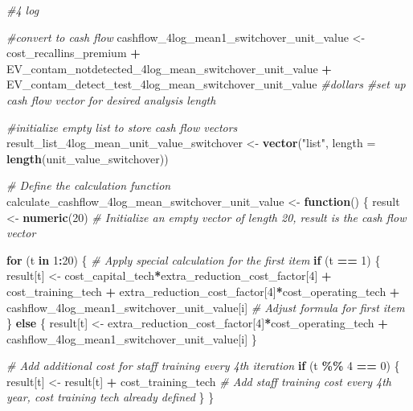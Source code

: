 \documentclass[
]{article}
\newenvironment{Shaded}{\begin{snugshade}}{\end{snugshade}}
\newcommand{\AttributeTok}[1]{\textcolor[rgb]{0.13,0.29,0.53}{#1}}
\newcommand{\CommentTok}[1]{\textcolor[rgb]{0.56,0.35,0.01}{\textit{#1}}}
\newcommand{\ControlFlowTok}[1]{\textcolor[rgb]{0.13,0.29,0.53}{\textbf{#1}}}
\newcommand{\DecValTok}[1]{\textcolor[rgb]{0.00,0.00,0.81}{#1}}
\newcommand{\FunctionTok}[1]{\textcolor[rgb]{0.13,0.29,0.53}{\textbf{#1}}}
\newcommand{\NormalTok}[1]{#1}
\newcommand{\OtherTok}[1]{\textcolor[rgb]{0.56,0.35,0.01}{#1}}
\newcommand{\SpecialCharTok}[1]{\textcolor[rgb]{0.81,0.36,0.00}{\textbf{#1}}}
\newcommand{\StringTok}[1]{\textcolor[rgb]{0.31,0.60,0.02}{#1}}
\begin{document}
\begin{Shaded}
\begin{Highlighting}[]
\CommentTok{\#4 log}

\CommentTok{\#convert to cash flow}
\NormalTok{cashflow\_4log\_mean1\_switchover\_unit\_value }\OtherTok{\textless{}{-}}\NormalTok{ cost\_recallins\_premium }\SpecialCharTok{+}\NormalTok{ EV\_contam\_notdetected\_4log\_mean\_switchover\_unit\_value }\SpecialCharTok{+}\NormalTok{ EV\_contam\_detect\_test\_4log\_mean\_switchover\_unit\_value }\CommentTok{\#dollars}
\CommentTok{\#set up cash flow vector for desired analysis length}


\CommentTok{\#initialize empty list to store cash flow vectors}
\NormalTok{result\_list\_4log\_mean\_unit\_value\_switchover }\OtherTok{\textless{}{-}} \FunctionTok{vector}\NormalTok{(}\StringTok{"list"}\NormalTok{, }\AttributeTok{length =} \FunctionTok{length}\NormalTok{(unit\_value\_switchover))}


\CommentTok{\# Define the calculation function}
\NormalTok{calculate\_cashflow\_4log\_mean\_switchover\_unit\_value }\OtherTok{\textless{}{-}} \ControlFlowTok{function}\NormalTok{() \{}
\NormalTok{  result }\OtherTok{\textless{}{-}} \FunctionTok{numeric}\NormalTok{(}\DecValTok{20}\NormalTok{)  }\CommentTok{\# Initialize an empty vector of length 20, result is the cash flow vector}
  
  \ControlFlowTok{for}\NormalTok{ (t }\ControlFlowTok{in} \DecValTok{1}\SpecialCharTok{:}\DecValTok{20}\NormalTok{) \{}
    \CommentTok{\# Apply special calculation for the first item}
    \ControlFlowTok{if}\NormalTok{ (t }\SpecialCharTok{==} \DecValTok{1}\NormalTok{) \{}
\NormalTok{      result[t] }\OtherTok{\textless{}{-}}\NormalTok{ cost\_capital\_tech}\SpecialCharTok{*}\NormalTok{extra\_reduction\_cost\_factor[}\DecValTok{4}\NormalTok{] }\SpecialCharTok{+}\NormalTok{ cost\_training\_tech }\SpecialCharTok{+}\NormalTok{ extra\_reduction\_cost\_factor[}\DecValTok{4}\NormalTok{]}\SpecialCharTok{*}\NormalTok{cost\_operating\_tech }\SpecialCharTok{+}\NormalTok{ cashflow\_4log\_mean1\_switchover\_unit\_value[i] }\CommentTok{\# Adjust formula for first item}
\NormalTok{    \} }\ControlFlowTok{else}\NormalTok{ \{}
\NormalTok{      result[t] }\OtherTok{\textless{}{-}}\NormalTok{ extra\_reduction\_cost\_factor[}\DecValTok{4}\NormalTok{]}\SpecialCharTok{*}\NormalTok{cost\_operating\_tech }\SpecialCharTok{+}\NormalTok{ cashflow\_4log\_mean1\_switchover\_unit\_value[i]}
\NormalTok{    \}}
    
    \CommentTok{\# Add additional cost for staff training every 4th iteration}
    \ControlFlowTok{if}\NormalTok{ (t }\SpecialCharTok{\%\%} \DecValTok{4} \SpecialCharTok{==} \DecValTok{0}\NormalTok{) \{}
\NormalTok{      result[t] }\OtherTok{\textless{}{-}}\NormalTok{ result[t] }\SpecialCharTok{+}\NormalTok{ cost\_training\_tech  }\CommentTok{\# Add staff training cost every 4th year, cost training tech already defined}
\NormalTok{    \}}
\NormalTok{  \}}
  

\end{Highlighting}
\end{Shaded}
\end{document}
